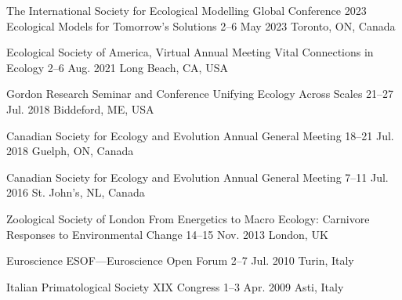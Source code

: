 \begin{cventries}

  \cventry
    {The International Society for Ecological Modelling Global Conference 2023} %
    {Ecological Models for Tomorrow's Solutions} %
    {2--6 May 2023} %
    {Toronto, ON, Canada} %
    {
    }

  \cventry
    {Ecological Society of America, Virtual Annual Meeting} %
    {Vital Connections in Ecology} %
    {2--6 Aug. 2021} %
    {Long Beach, CA, USA} %
    {
    }

  \cventry
    {Gordon Research Seminar and Conference} %
    {Unifying Ecology Across Scales} %
    {21--27 Jul. 2018} %
    {Biddeford, ME, USA} %
    {
    }

  \cventry
    {Canadian Society for Ecology and Evolution} %
    {Annual General Meeting} %
    {18--21 Jul. 2018} %
    {Guelph, ON, Canada} %
    {
    }

  \cventry
    {Canadian Society for Ecology and Evolution} %
    {Annual General Meeting} %
    {7--11 Jul. 2016} %
    {St. John's, NL, Canada} %
    {
    }

  \cventry
    {Zoological Society of London} %
    {From Energetics to Macro Ecology: Carnivore Responses to Environmental Change} %
    {14--15 Nov. 2013} %
    {London, UK} %
    {
    }

  \cventry
    {Euroscience} %
    {ESOF---Euroscience Open Forum} %
    {2--7 Jul. 2010} %
    {Turin, Italy} %
    {
    }

  \cventry
    {Italian Primatological Society} %
    {XIX Congress} %
    {1--3 Apr. 2009} %
    {Asti, Italy} %
    {
    }

\end{cventries}
